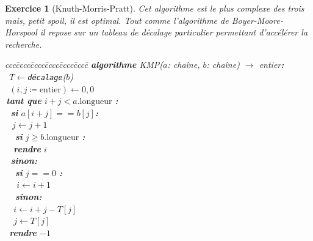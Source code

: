 \documentclass{article}
\theoremstyle{exostyle}
\newtheorem{exo}{Exercice}
\theoremstyle{partiestyle}
\theoremstyle{questionstyle}
\begin{document}
\begin{exo}[Knuth-Morris-Pratt]
    Cet algorithme est le plus complexe des trois mais, petit {\it spoil}, il est optimal. Tout comme l'algorithme de Boyer-Moore-Horspool il repose sur un tableau de décalage particulier permettant d'accélérer la recherche.
    
        \begin{tabbing}
            ccc\=cccc\=cccc\=cccc\=cccc\=cccc\=\kill
            \textbf{algorithme} \textsc{KMP}($a$: chaîne, $b$: chaîne) $\rightarrow$ entier{\bf :}\\
            \>\vline$\,$ $T \leftarrow$\texttt{décalage}($b$)\\
            \>\vline$\,$ $(i, j \coloneqq \text{entier}) \leftarrow 0, 0$\\
            \>\vline$\,$\textbf{tant que} $i + j < a.\text{longueur}$ {\bf :}\\
            \>\vline$\,$\>\vline$\,$ \textbf{si} $a[i + j] == b[j]${\bf :}\\
            \>\vline$\,$\>\vline$\,$\>\vline$\,$ $j \leftarrow j +1$\\
            \>\vline$\,$\>\vline$\,$ \>\vline$\,$ \textbf{si} $j \geq b.\text{longueur}$ {\bf :}\\
            \>\vline$\,$\>\vline$\,$\>\vline$\,$\>\vline$\,$ \textbf{rendre} $i$\\
            \>\vline$\,$\>\vline$\,$ \textbf{sinon}{\bf :}\\
            \>\vline$\,$\>\vline$\,$ \>\vline$\,$ \textbf{si} $j == 0$ {\bf :}\\
            \>\vline$\,$\>\vline$\,$ \>\vline$\,$\>\vline$\,$ $i \leftarrow i +1$\\
            \>\vline$\,$\>\vline$\,$ \>\vline$\,$ \textbf{sinon}{\bf :}\\
            \>\vline$\,$\>\vline$\,$\>\vline$\,$\>\vline$\,$ $i \leftarrow i + j - T[j]$\\
            \>\vline$\,$\>\vline$\,$\>\vline$\,$\>\vline$\,$ $j \leftarrow T[j]$\\
            \>\vline$\,$ \textbf{rendre} $-1$\\


\end{tabbing}
\end{exo}
\end{document}
